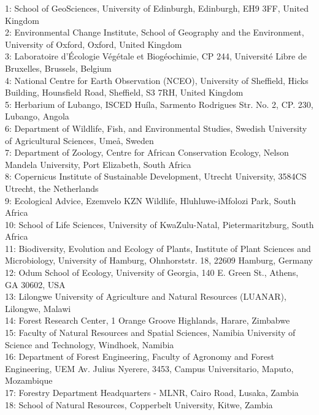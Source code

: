 \documentclass[11pt,a4paper]{article}
\begin{document}
1: School of GeoSciences, University of Edinburgh, Edinburgh, EH9 3FF, United Kingdom \\
2: Environmental Change Institute, School of Geography and the Environment, University of Oxford, Oxford, United Kingdom \\
3: Laboratoire d'\'{E}cologie V\'{e}g\'{e}tale et Biogéochimie, CP 244, Universit\'{e} Libre de Bruxelles, Brussels, Belgium \\
4: National Centre for Earth Observation (NCEO), University of Sheffield, Hicks Building, Hounsfield Road, Sheffield, S3 7RH, United Kingdom \\
5: Herbarium of Lubango, ISCED Hu\'{i}la, Sarmento Rodrigues Str. No. 2, CP. 230, Lubango, Angola \\
6: Department of Wildlife, Fish, and Environmental Studies, Swedish University of Agricultural Sciences, Ume\aa, Sweden \\
7: Department of Zoology, Centre for African Conservation Ecology, Nelson Mandela University, Port Elizabeth, South Africa \\
8: Copernicus Institute of Sustainable Development, Utrecht University, 3584CS Utrecht, the Netherlands \\
9: Ecological Advice, Ezemvelo KZN Wildlife, Hluhluwe-iMfolozi Park, South Africa \\
10: School of Life Sciences, University of KwaZulu-Natal, Pietermaritzburg, South Africa \\
11: Biodiversity, Evolution and Ecology of Plants, Institute of Plant Sciences and Microbiology, University of Hamburg, Ohnhorststr. 18, 22609 Hamburg, Germany \\
12: Odum School of Ecology, University of Georgia, 140 E. Green St., Athens, GA 30602, USA \\
13: Lilongwe University of Agriculture and Natural Resources (LUANAR), Lilongwe, Malawi \\
14: Forest Research Center, 1 Orange Groove Highlands, Harare, Zimbabwe \\
15: Faculty of Natural Resources and Spatial Sciences, Namibia University of Science and Technology, Windhoek, Namibia \\
16: Department of Forest Engineering, Faculty of Agronomy and Forest Engineering, UEM Av. Julius Nyerere, 3453, Campus Universitario, Maputo, Mozambique \\
17: Forestry Department Headquarters - MLNR, Cairo Road, Lusaka, Zambia \\
18: School of Natural Resources, Copperbelt University, Kitwe, Zambia \\
\end{document}
